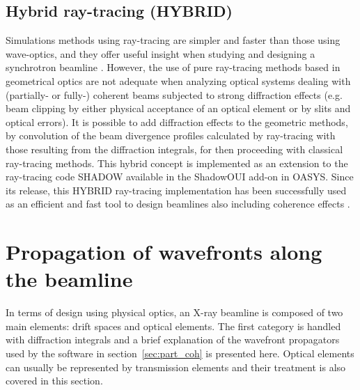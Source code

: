 \documentclass{iucr}              %
\begin{document}
\subsection{Hybrid ray-tracing (HYBRID)}

Simulations methods using ray-tracing are simpler and faster than those using wave-optics, and they offer useful insight when studying and designing a synchrotron beamline \cite{hierarchical}. However, the use of pure ray-tracing methods based in geometrical optics are not adequate when analyzing optical systems dealing with (partially- or fully-) coherent beams subjected to strong diffraction effects (e.g. beam clipping by either physical acceptance of an optical element or by slits and optical errors). It is possible to add diffraction effects to the geometric methods, by convolution of the beam divergence profiles calculated by ray-tracing with those resulting from the diffraction integrals, for then proceeding with classical ray-tracing methods. This hybrid concept \cite{codeHYBRID} is implemented as an extension to the ray-tracing code SHADOW \cite{codeSHADOW} available in the ShadowOUI \cite{codeSHADOWOUI} add-on in OASYS. Since its release, this HYBRID ray-tracing implementation has been successfully used as an efficient and fast tool to design beamlines also including coherence effects \cite{Shi2017,Luca2020, Lordano2022}.

\section{Propagation of wavefronts along the beamline\\}\label{sec:propagation}

 In terms of design using physical optics, an X-ray beamline is composed of two main elements: drift spaces and optical elements. The first category is handled with diffraction integrals and a brief explanation of the wavefront propagators used by the software in section~\ref{sec:part_coh} is presented here. Optical elements can usually be represented by transmission elements and their treatment is also covered in this section. 
\end{document}
